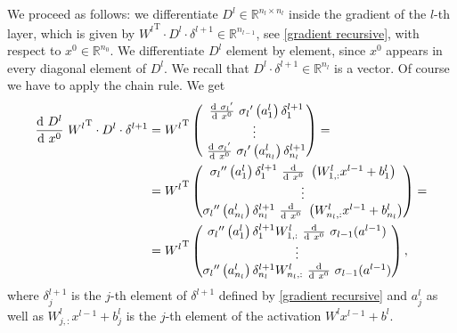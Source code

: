 We proceed as follows: we differentiate $D^{l} \in \mathbb{R}^{n_l \times n_l}$ inside the gradient of the $l$-th layer, which is given by ${W^{l}}^{\mathrm{T}} \cdot D^{l} \cdot \delta^{l+1} \in \mathbb{R}^{n_{l-1}}$, see \cref{gradient recursive}, with respect to $x^0 \in \mathbb{R}^{n_0}$. We differentiate $D^l$ element by element, since $x^0$ appears in every diagonal element of $D^{l}$. We recall that $D^{l} \cdot \delta^{l+1} \in \mathbb{R}^{n_l}$ is a vector. Of course we have to apply the chain rule. We get
\begin{equation} 
    \label{pervert differential}
    \begin{aligned}
        \frac{\textup{d} \ D^{l}}{\textup{d} \ x^0} \  {W^{l}}^{\mathrm{T}} \cdot D^{l} \cdot \delta^{l+1} & = {W^{l}}^{\mathrm{T}} \begin{pmatrix}\ \frac{\textup{d} \ {\sigma_{l}}^{\prime}}{\textup{d} \ x^0} \  {\sigma_{l}}^{\prime} \left( a^{l}_1 \right) \delta^{l+1}_1 \\ \vdots \\ \ \frac{\textup{d} \ {\sigma_{l}}^{\prime}}{\textup{d} \ x^0} \  {\sigma_{l}}^{\prime} \left( a^{l}_{n_l} \right) \delta^{l+1}_{n_l} \end{pmatrix} = \\
        & = {W^{l}}^{\mathrm{T}} \begin{pmatrix} {\sigma_{l}}^{\prime \prime} \left( a^{l}_1 \right) \delta^{l+1}_1\ \frac{\textup{d}}{\textup{d} \ x^0} \  \left( W^{l}_{1,:} x^{l-1} + b^l_{1} \right) \\ \vdots \\ {\sigma_{l}}^{\prime \prime} \left( a^{l}_{n_l} \right) \delta^{l+1}_{n_l} \ \frac{\textup{d}}{\textup{d} \ x^0} \  \left( W^{l}_{n_l,:} x^{l-1} + b^l_{n_l} \right) \end{pmatrix} = \\
        & = {W^{l}}^{\mathrm{T}} \begin{pmatrix} {\sigma_{l}}^{\prime \prime} \left( a^{l}_1 \right) \delta^{l+1}_1 W^{l}_{1,:} \ \frac{\textup{d}}{\textup{d} \ x^0} \  \sigma_{l-1}(a^{l-1})\\ \vdots \\ {\sigma_{l}}^{\prime \prime} \left( a^{l}_{n_l} \right) \delta^{l+1}_{n_l}  W^{l}_{n_l,:} \ \frac{\textup{d}}{\textup{d} \ x^0} \  \sigma_{l-1}(a^{l-1}) \end{pmatrix},
    \end{aligned} 
\end{equation}
where $\delta^{l+1}_j$ is the $j$-th element of $\delta^{l+1}$ defined by \cref{gradient recursive} and $a^{l}_j$ as well as $W^{l}_{j,:} x^{l-1} + b^l_{j}$ is the $j$-th element of the activation $W^l x^{l-1} + b^l$. \\
